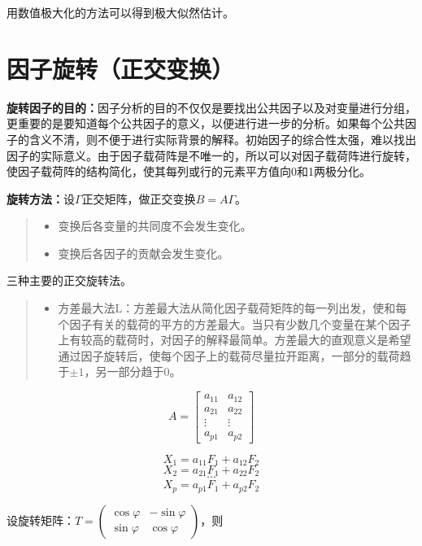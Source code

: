 \documentclass[]{ctexbook}
\providecommand{\tightlist}{%
  \setlength{\itemsep}{0pt}\setlength{\parskip}{0pt}}
\begin{document}
用数值极大化的方法可以得到极大似然估计。

\hypertarget{ux56e0ux5b50ux65cbux8f6cux6b63ux4ea4ux53d8ux6362}{%
\section{因子旋转（正交变换）}\label{ux56e0ux5b50ux65cbux8f6cux6b63ux4ea4ux53d8ux6362}}

\textbf{旋转因子的目的：}因子分析的目的不仅仅是要找出公共因子以及对变量进行分组，更重要的是要知道每个公共因子的意义，以便进行进一步的分析。如果每个公共因子的含义不清，则不便于进行实际背景的解释。初始因子的综合性太强，难以找出因子的实际意义。由于因子载荷阵是不唯一的，所以可以对因子载荷阵进行旋转，使因子载荷阵的结构简化，使其每列或行的元素平方值向0和1两极分化。

\textbf{旋转方法：}设\(\Gamma\)正交矩阵，做正交变换\(B=A\Gamma\)。

\begin{quote}
\begin{itemize}
\tightlist
\item
  变换后各变量的共同度不会发生变化。
\item
  变换后各因子的贡献会发生变化。
\end{itemize}
\end{quote}

三种主要的正交旋转法。

\begin{quote}
\begin{itemize}
\tightlist
\item
  方差最大法L：方差最大法从简化因子载荷矩阵的每一列出发，使和每个因子有关的载荷的平方的方差最大。当只有少数几个变量在某个因子上有较高的载荷时，对因子的解释最简单。方差最大的直观意义是希望通过因子旋转后，使每个因子上的载荷尽量拉开距离，一部分的载荷趋于\(\pm1\)，另一部分趋于0。
\end{itemize}
\end{quote}

\[A=\begin {bmatrix}a_{11}&a_{12}\\a_{21}&a_{22}\\\vdots&\vdots\\a_{p1}&a_{p2} \end {bmatrix}\]

\[X_1=a_{11}F_1+a_{12}F_2\]\[X_2=a_{21}F_1+a_{22}F_2\]\[\cdots\]\[X_p=a_{p1}F_1+a_{p2}F_2\]

设旋转矩阵：\(T=\begin {pmatrix}\cos\varphi&-\sin\varphi\\\sin\varphi&\cos\varphi \end {pmatrix}\)，则
\end{document}
